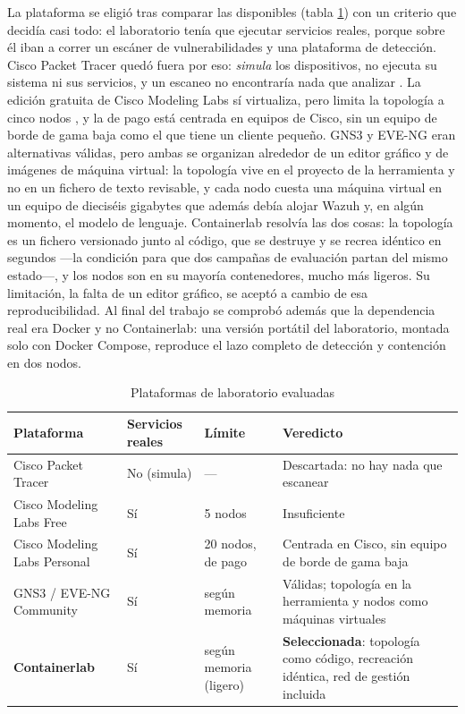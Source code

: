La plataforma se eligió tras comparar las disponibles (tabla \ref{tab:plataformas}) con un criterio
que decidía casi todo: el laboratorio tenía que ejecutar servicios reales, porque sobre él iban a
correr un escáner de vulnerabilidades y una plataforma de detección. Cisco Packet Tracer quedó fuera
por eso: \emph{simula} los dispositivos, no ejecuta su sistema ni sus servicios, y un escaneo no
encontraría nada que analizar \cite{packettracer}. La edición gratuita de Cisco Modeling Labs sí
virtualiza, pero limita la topología a cinco nodos \cite{cmlfree}, y la de pago está centrada en
equipos de Cisco, sin un equipo de borde de gama baja como el que tiene un cliente pequeño. GNS3
\cite{gns3} y EVE-NG \cite{eveng} eran alternativas válidas, pero ambas se organizan alrededor de un
editor gráfico y de imágenes de máquina virtual: la topología vive en el proyecto de la herramienta
y no en un fichero de texto revisable, y cada nodo cuesta una máquina virtual en un equipo de
dieciséis gigabytes que además debía alojar Wazuh y, en algún momento, el modelo de lenguaje.
Containerlab resolvía las dos cosas: la topología es un fichero versionado junto al código, que se
destruye y se recrea idéntico en segundos ---la condición para que dos campañas de evaluación partan
del mismo estado---, y los nodos son en su mayoría contenedores, mucho más ligeros. Su limitación, la
falta de un editor gráfico, se aceptó a cambio de esa reproducibilidad. Al final del trabajo se
comprobó además que la dependencia real era Docker y no Containerlab: una versión portátil del
laboratorio, montada solo con Docker Compose, reproduce el lazo completo de detección y contención
en dos nodos.

\begin{table}[H]
  \centering
  \caption{Plataformas de laboratorio evaluadas}
  \label{tab:plataformas}
  \begin{tabular}{@{}p{}p{}p{}p{}@{}}
    \toprule
    \textbf{Plataforma} & \textbf{Servicios reales} & \textbf{Límite} & \textbf{Veredicto} \\
    \midrule
    Cisco Packet Tracer & No (simula) & --- & Descartada: no hay nada que escanear \\
    Cisco Modeling Labs Free & Sí & 5 nodos & Insuficiente \\
    Cisco Modeling Labs Personal & Sí & 20 nodos, de pago & Centrada en Cisco, sin equipo de borde de gama baja \\
    GNS3 / EVE-NG Community & Sí & según memoria & Válidas; topología en la herramienta y nodos como máquinas virtuales \\
    \textbf{Containerlab} & Sí & según memoria (ligero) & \textbf{Seleccionada}: topología como código, recreación idéntica, red de gestión incluida \\
    \bottomrule
  \end{tabular}
\end{table}

